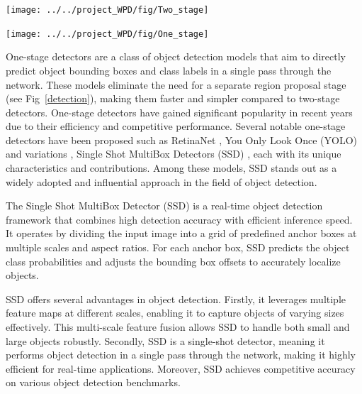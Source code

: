 \documentclass[a4paper]{article}
\begin{document}
	\begin{center}
		\begin{minipage}{1.0\linewidth}
			\centering
			\texttt{[image: ../../project\_WPD/fig/Two\_stage]}
			\captionsetup{labelformat=empty} %
			\captionsetup{labelformat=empty} %
			
		\end{minipage}
		
		\vspace{1cm}
		
		\begin{minipage}{1.0\linewidth}
			\centering
			\texttt{[image: ../../project\_WPD/fig/One\_stage]}
			\captionsetup{labelformat=empty} %
			
		\end{minipage}
		\label{detection}
	\end{center}
	
	One-stage detectors are a class of object detection models that aim to directly predict object bounding boxes and class labels in a single pass through the network. These models eliminate the need for a separate region proposal stage (see Fig~\ref{detection}), making them faster and simpler compared to two-stage detectors. One-stage detectors have gained significant popularity in recent years due to their efficiency and competitive performance. Several notable one-stage detectors have been proposed such as RetinaNet \cite{focalloss}, You Only Look Once (YOLO) and variations \cite{yolov1, yolov2, yolov3}, Single Shot MultiBox Detectors (SSD) \cite{ssd}, each with its unique characteristics and contributions. Among these models, SSD stands out as a widely adopted and influential approach in the field of object detection.


	The Single Shot MultiBox Detector (SSD) is a real-time object detection framework that combines high detection accuracy with efficient inference speed. It operates by dividing the input image into a grid of predefined anchor boxes at multiple scales and aspect ratios. For each anchor box, SSD predicts the object class probabilities and adjusts the bounding box offsets to accurately localize objects.

	SSD offers several advantages in object detection. Firstly, it leverages multiple feature maps at different scales, enabling it to capture objects of varying sizes effectively. This multi-scale feature fusion allows SSD to handle both small and large objects robustly. Secondly, SSD is a single-shot detector, meaning it performs object detection in a single pass through the network, making it highly efficient for real-time applications. Moreover, SSD achieves competitive accuracy on various object detection benchmarks.
\end{document}
